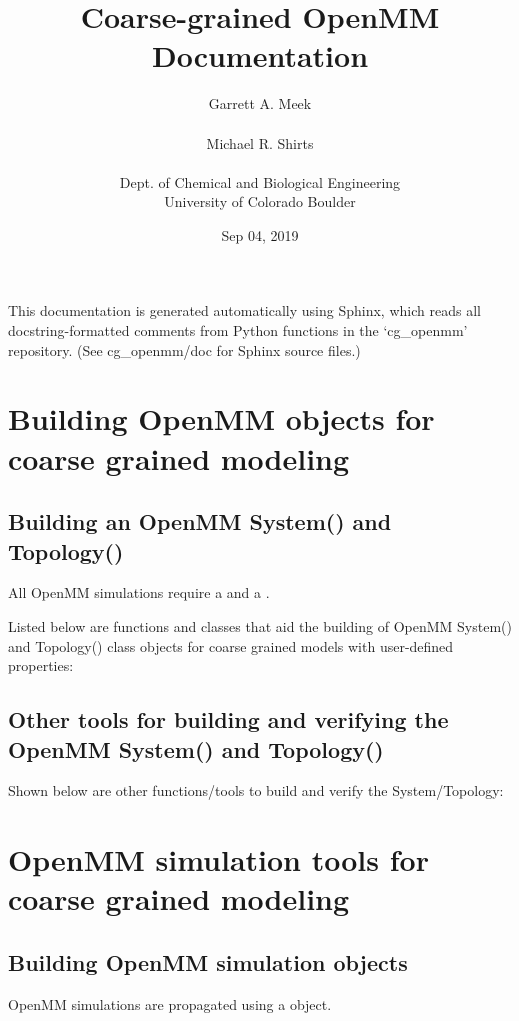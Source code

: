 \documentclass[letterpaper,12pt,english,openany,oneside]{sphinxmanual}
\title{Coarse-grained OpenMM Documentation}
\date{Sep 04, 2019}
\author{Garrett A. Meek\\ \\Michael R. Shirts\\ \\Dept. of Chemical and Biological Engineering\\University of Colorado Boulder}
\begin{document}
\pagestyle{empty}
\sphinxmaketitle
\pagestyle{plain}
\sphinxtableofcontents
\pagestyle{normal}
\label{\detokenize{index::doc}}


This documentation is generated automatically using Sphinx, which reads all docstring-formatted comments from Python functions in the ‘cg\_openmm’ repository.  (See cg\_openmm/doc for Sphinx source files.)


\chapter{Building OpenMM objects for coarse grained modeling}
\label{\detokenize{build:building-openmm-objects-for-coarse-grained-modeling}}\label{\detokenize{build::doc}}

\section{Building an OpenMM System() and Topology()}
\label{\detokenize{build:building-an-openmm-system-and-topology}}
All OpenMM simulations require a  and a .

Listed below are functions and classes that aid the building of OpenMM System() and Topology() class objects for coarse grained models with user-defined properties:


\section{Other tools for building and verifying the OpenMM System() and Topology()}
\label{\detokenize{build:other-tools-for-building-and-verifying-the-openmm-system-and-topology}}
Shown below are other functions/tools to build and verify the System/Topology:


\chapter{OpenMM simulation tools for coarse grained modeling}
\label{\detokenize{simulation:openmm-simulation-tools-for-coarse-grained-modeling}}\label{\detokenize{simulation::doc}}

\section{Building OpenMM simulation objects}
\label{\detokenize{simulation:building-openmm-simulation-objects}}
OpenMM simulations are propagated using a  object.
\end{document}
